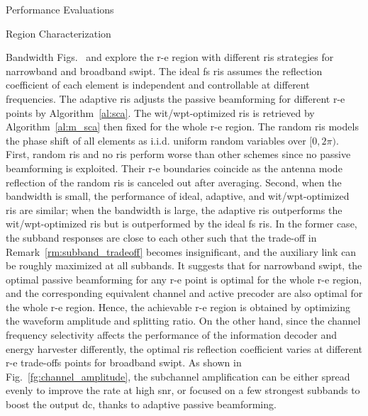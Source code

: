 \begin{section}{Performance Evaluations}
\begin{subsection}{ Region Characterization}
\begin{subsubsection}{Bandwidth}
			Figs.~ and  explore the \gls{r-e} region with different \gls{ris} strategies for narrowband and broadband \gls{swipt}. The ideal \gls{fs} \gls{ris} assumes the reflection coefficient of each element is independent and controllable at different frequencies. The adaptive \gls{ris} adjusts the passive beamforming for different \gls{r-e} points by Algorithm~\ref{al:sca}. The \gls{wit}/\gls{wpt}-optimized \gls{ris} is retrieved by Algorithm~\ref{al:m_sca} then fixed for the whole \gls{r-e} region. The random \gls{ris} models the phase shift of all elements as i.i.d. uniform random variables over $[0, 2\pi)$. First, random \gls{ris} and no \gls{ris} perform worse than other schemes since no passive beamforming is exploited. Their \gls{r-e} boundaries coincide as the antenna mode reflection of the random \gls{ris} is canceled out after averaging. Second, when the bandwidth is small, the performance of ideal, adaptive, and \gls{wit}/\gls{wpt}-optimized \gls{ris} are similar; when the bandwidth is large, the adaptive \gls{ris} outperforms the \gls{wit}/\gls{wpt}-optimized \gls{ris} but is outperformed by the ideal \gls{fs} \gls{ris}. In the former case, the subband responses are close to each other such that the trade-off in Remark~\ref{rm:subband_tradeoff} becomes insignificant, and the auxiliary link can be roughly maximized at all subbands. It suggests that for narrowband \gls{swipt}, the optimal passive beamforming for any \gls{r-e} point is optimal for the whole \gls{r-e} region, and the corresponding equivalent channel and active precoder are also optimal for the whole \gls{r-e} region. Hence, the achievable \gls{r-e} region is obtained by optimizing the waveform amplitude and splitting ratio. On the other hand, since the channel frequency selectivity affects the performance of the information decoder and energy harvester differently, the optimal \gls{ris} reflection coefficient varies at different \gls{r-e} trade-offs points for broadband \gls{swipt}. As shown in Fig.~\ref{fg:channel_amplitude}, the subchannel amplification can be either spread evenly to improve the rate at high \gls{snr}, or focused on a few strongest subbands to boost the output \gls{dc}, thanks to adaptive passive beamforming.
		\end{subsubsection}


\end{subsection}
\end{section}
